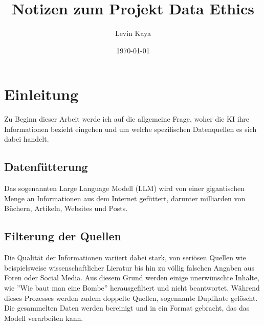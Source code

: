 \documentclass{article}
\title{Notizen zum Projekt Data Ethics}
\author{Levin Kaya}
\date{\today}
\begin{document}
\maketitle


\tableofcontents

\section{Einleitung}
Zu Beginn dieser Arbeit werde ich auf die allgemeine Frage, woher die KI ihre Informationen bezieht eingehen und um welche spezifischen Datenquellen es sich dabei handelt. 
\subsection{Datenfütterung}
Das sogenannten Large Language Modell (LLM) wird von einer gigantischen Menge an Informationen aus dem Internet gefüttert, darunter milliarden von Büchern, Artikeln, Websites und Posts.
\subsection{Filterung der Quellen} 
Die Qualität der Informationen variiert dabei stark, von seriösen Quellen wie beispielsweise wissenschaftlicher Lieratur bis hin zu völlig falschen Angaben aus Foren oder Social Media. Aus diesem Grund werden einige unerwünschte Inhalte, wie ''Wie baut man eine Bombe'' herausgefiltert und nicht beantwortet. Während dieses Prozesses werden zudem doppelte Quellen, sogennante Duplikate gelöscht. Die gesammelten Daten werden bereinigt und in ein Format gebracht, das das Modell verarbeiten kann.
\end{document}
